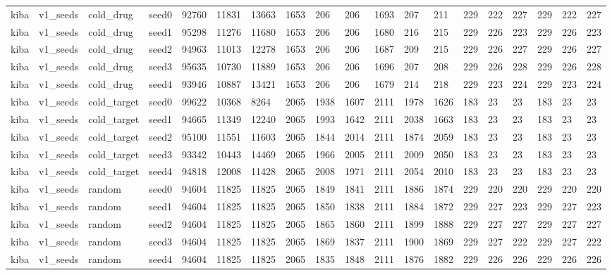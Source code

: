 \begin{table}[htbp]
\begin{tabular}{lllllllllllllllllll}
kiba & v1\_seeds & cold\_drug & seed0 & 92760 & 11831 & 13663 & 1653 & 206 & 206 & 1693 & 207 & 211 & 229 & 222 & 227 & 229 & 222 & 227 \\
kiba & v1\_seeds & cold\_drug & seed1 & 95298 & 11276 & 11680 & 1653 & 206 & 206 & 1680 & 216 & 215 & 229 & 226 & 223 & 229 & 226 & 223 \\
kiba & v1\_seeds & cold\_drug & seed2 & 94963 & 11013 & 12278 & 1653 & 206 & 206 & 1687 & 209 & 215 & 229 & 226 & 227 & 229 & 226 & 227 \\
kiba & v1\_seeds & cold\_drug & seed3 & 95635 & 10730 & 11889 & 1653 & 206 & 206 & 1696 & 207 & 208 & 229 & 226 & 228 & 229 & 226 & 228 \\
kiba & v1\_seeds & cold\_drug & seed4 & 93946 & 10887 & 13421 & 1653 & 206 & 206 & 1679 & 214 & 218 & 229 & 223 & 224 & 229 & 223 & 224 \\
kiba & v1\_seeds & cold\_target & seed0 & 99622 & 10368 & 8264 & 2065 & 1938 & 1607 & 2111 & 1978 & 1626 & 183 & 23 & 23 & 183 & 23 & 23 \\
kiba & v1\_seeds & cold\_target & seed1 & 94665 & 11349 & 12240 & 2065 & 1993 & 1642 & 2111 & 2038 & 1663 & 183 & 23 & 23 & 183 & 23 & 23 \\
kiba & v1\_seeds & cold\_target & seed2 & 95100 & 11551 & 11603 & 2065 & 1844 & 2014 & 2111 & 1874 & 2059 & 183 & 23 & 23 & 183 & 23 & 23 \\
kiba & v1\_seeds & cold\_target & seed3 & 93342 & 10443 & 14469 & 2065 & 1966 & 2005 & 2111 & 2009 & 2050 & 183 & 23 & 23 & 183 & 23 & 23 \\
kiba & v1\_seeds & cold\_target & seed4 & 94818 & 12008 & 11428 & 2065 & 2008 & 1971 & 2111 & 2054 & 2010 & 183 & 23 & 23 & 183 & 23 & 23 \\
kiba & v1\_seeds & random & seed0 & 94604 & 11825 & 11825 & 2065 & 1849 & 1841 & 2111 & 1886 & 1874 & 229 & 220 & 220 & 229 & 220 & 220 \\
kiba & v1\_seeds & random & seed1 & 94604 & 11825 & 11825 & 2065 & 1850 & 1838 & 2111 & 1884 & 1872 & 229 & 227 & 223 & 229 & 227 & 223 \\
kiba & v1\_seeds & random & seed2 & 94604 & 11825 & 11825 & 2065 & 1865 & 1860 & 2111 & 1899 & 1888 & 229 & 227 & 227 & 229 & 227 & 227 \\
kiba & v1\_seeds & random & seed3 & 94604 & 11825 & 11825 & 2065 & 1869 & 1837 & 2111 & 1900 & 1869 & 229 & 227 & 222 & 229 & 227 & 222 \\
kiba & v1\_seeds & random & seed4 & 94604 & 11825 & 11825 & 2065 & 1835 & 1848 & 2111 & 1876 & 1882 & 229 & 226 & 226 & 229 & 226 & 226 \\

\end{tabular}
\end{table}
